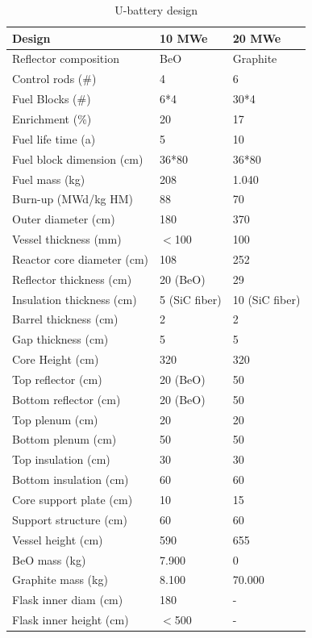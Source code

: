 \documentclass[10pt,a4paper]{article}
\begin{document}
\begin{table} [htbp]
\begin{center}

\caption{U-battery design}
\label{Utable}
\begin{tabular}{l l l}
\hline 
Design 		&10 MWe &20 MWe\\ 
\hline 
Reflector composition & BeO          &  Graphite\\
Control rods (\#) & 4                        &  6 \\
Fuel Blocks (\#) & 6*4                     & 30*4 \\
Enrichment (\%) & 20                      & 17  \\
Fuel life time (a)&  5                       & 10  \\
Fuel block dimension (cm) & 36*80 &  36*80 \\
Fuel mass (kg) & 208                     &   1.040\\
Burn-up (MWd/kg HM)  & 88           &   70 \\
\hline 
Outer diameter (cm)             &   180  &  370   \\
Vessel thickness (mm)        &   $<$100       & 100   \\
Reactor core diameter (cm)  &   108     &  252  \\
Reflector thickness (cm)      &   20 (BeO)    &29    \\
Insulation thickness (cm)     &   5 (SiC fiber)     & 10 (SiC fiber)   \\
Barrel thickness (cm)           &    2   & 2    \\
Gap thickness (cm)             &    5  &  5  \\
\hline 
Core Height (cm)          & 320         & 320 \\
Top reflector (cm)         &  20 (BeO)&50  \\
Bottom reflector (cm)    &  20 (BeO)& 50 \\
Top plenum (cm)          &20            &20  \\
Bottom plenum (cm)     &  50          &50  \\
Top insulation (cm)       &30           &30 \\
Bottom insulation (cm)  &  60         &60 \\
Core support plate (cm) &  10         &15  \\
Support structure (cm)  &   60         &60  \\
Vessel height (cm)       & 590         &655  \\
\hline 
BeO mass (kg) &    7.900       &0  \\
Graphite mass (kg) &   8.100        & 70.000  \\
Flask inner diam (cm)& 180       & - \\
Flask inner height (cm)& $<$500         & - \\
\hline 

\end{tabular}
\end{center}
\end{table}
\end{document}
